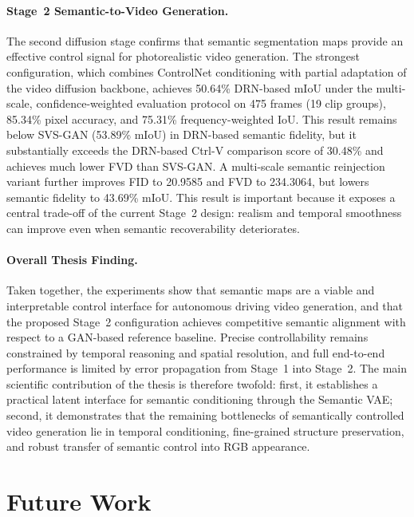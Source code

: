 \paragraph{Stage~2 Semantic-to-Video Generation.}
The second diffusion stage confirms that semantic segmentation maps provide an effective control signal for photorealistic video generation. The strongest configuration, which combines ControlNet conditioning with partial adaptation of the video diffusion backbone, achieves 50.64\% DRN-based mIoU under the multi-scale, confidence-weighted evaluation protocol on 475 frames (19 clip groups), 85.34\% pixel accuracy, and 75.31\% frequency-weighted IoU. This result remains below SVS-GAN (53.89\% mIoU) in DRN-based semantic fidelity, but it substantially exceeds the DRN-based Ctrl-V comparison score of 30.48\% and achieves much lower FVD than SVS-GAN. A multi-scale semantic reinjection variant further improves FID to 20.9585 and FVD to 234.3064, but lowers semantic fidelity to 43.69\% mIoU. This result is important because it exposes a central trade-off of the current Stage~2 design: realism and temporal smoothness can improve even when semantic recoverability deteriorates.

\paragraph{Overall Thesis Finding.}
Taken together, the experiments show that semantic maps are a viable and interpretable control interface for autonomous driving video generation, and that the proposed Stage~2 configuration achieves competitive semantic alignment with respect to a GAN-based reference baseline. Precise controllability remains constrained by temporal reasoning and spatial resolution, and full end-to-end performance is limited by error propagation from Stage~1 into Stage~2. The main scientific contribution of the thesis is therefore twofold: first, it establishes a practical latent interface for semantic conditioning through the Semantic VAE; second, it demonstrates that the remaining bottlenecks of semantically controlled video generation lie in temporal conditioning, fine-grained structure preservation, and robust transfer of semantic control into RGB appearance.

\section{Future Work}
\label{sec:future}

